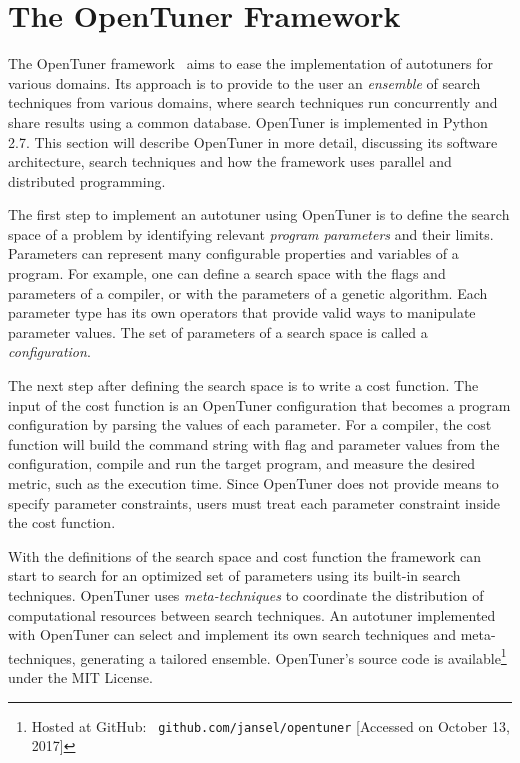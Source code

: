 \section{The OpenTuner Framework}
\label{sec:opentuner}

The OpenTuner framework~\cite{ansel2014opentuner}  aims to ease the
implementation of autotuners for various domains. Its approach is to provide to
the user an \emph{ensemble} of search techniques from various domains, where
search techniques run concurrently and share results using a common
database.  OpenTuner is implemented in Python 2.7.  This section will describe
OpenTuner in more detail, discussing its software architecture, search
techniques and how the framework uses parallel and distributed programming.

The first step to implement an autotuner using OpenTuner is to define the
search space of a problem by identifying relevant \emph{program parameters} and
their limits. Parameters can represent many configurable properties and
variables of a program. For example, one can define a search space with the
flags and parameters of a compiler, or with the parameters of a genetic
algorithm.  Each parameter type has its own operators that provide valid
ways to manipulate parameter values.  The set of parameters of a search space
is called a \emph{configuration}.

The next step after defining the search space is to write a cost function.  The
input of the cost function is an OpenTuner configuration that becomes a program
configuration by parsing the values of each parameter.  For a compiler, the
cost function will build the command string with flag and parameter values from
the configuration, compile and run the target program, and measure the desired
metric, such as the execution time.  Since OpenTuner does not provide means to
specify parameter constraints, users must treat each parameter constraint
inside the cost function.

With the definitions of the search space and cost function the framework can
start to search for an optimized set of parameters using its built-in search
techniques.  OpenTuner uses \emph{meta-techniques} to coordinate the
distribution of computational resources between search techniques. An autotuner
implemented with OpenTuner can select and implement its own search techniques
and meta-techniques, generating a tailored ensemble.  OpenTuner's source code
is available\footnote{Hosted at GitHub: \texttt{\scriptsize
github.com/jansel/opentuner} [Accessed on October 13, 2017]} under the MIT
License.

